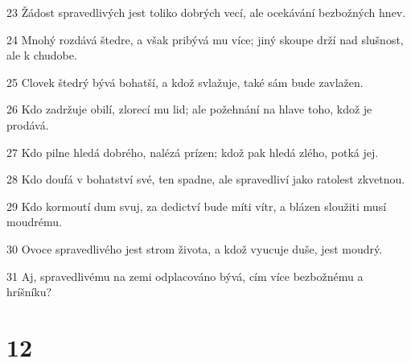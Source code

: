 \par 23 Žádost spravedlivých jest toliko dobrých vecí, ale ocekávání bezbožných hnev.
\par 24 Mnohý rozdává štedre, a však pribývá mu více; jiný skoupe drží nad slušnost, ale k chudobe.
\par 25 Clovek štedrý bývá bohatší, a kdož svlažuje, také sám bude zavlažen.
\par 26 Kdo zadržuje obilí, zlorecí mu lid; ale požehnání na hlave toho, kdož je prodává.
\par 27 Kdo pilne hledá dobrého, nalézá prízen; kdož pak hledá zlého, potká jej.
\par 28 Kdo doufá v bohatství své, ten spadne, ale spravedliví jako ratolest zkvetnou.
\par 29 Kdo kormoutí dum svuj, za dedictví bude míti vítr, a blázen sloužiti musí moudrému.
\par 30 Ovoce spravedlivého jest strom života, a kdož vyucuje duše, jest moudrý.
\par 31 Aj, spravedlivému na zemi odplacováno bývá, cím více bezbožnému a hríšníku?

\chapter{12}

